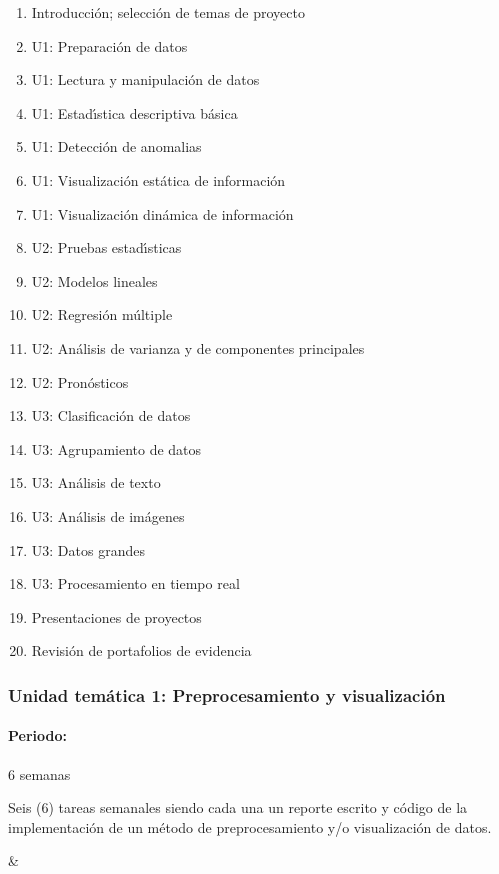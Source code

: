 \begin{enumerate}[itemsep=-3pt]
\item{Introducci\'{o}n; selecci\'{o}n de temas de proyecto}
\item{U1: Preparaci\'{o}n de datos}
\item{U1: Lectura y manipulaci\'{o}n de datos}
\item{U1: Estad\'{\i}stica descriptiva b\'{a}sica}
\item{U1: Detecci\'{o}n de anomalias}
\item{U1: Visualizaci\'{o}n est\'{a}tica de informaci\'{o}n}
\item{U1: Visualizaci\'{o}n din\'{a}mica de informaci\'{o}n}
\item{U2: Pruebas estad\'{\i}sticas}
\item{U2: Modelos lineales}
\item{U2: Regresi\'{o}n m\'{u}ltiple}
\item{U2: An\'{a}lisis de varianza y de componentes principales}
\item{U2: Pron\'{o}sticos}
\item{U3: Clasificaci\'{o}n de datos}
\item{U3: Agrupamiento de datos}
\item{U3: An\'{a}lisis de texto}
\item{U3: An\'{a}lisis de im\'{a}genes}
\item{U3: Datos grandes}
\item{U3: Procesamiento en tiempo real}
\item{Presentaciones de proyectos}
\item{Revisi\'{o}n de portafolios de evidencia}
\end{enumerate}


\subsubsection{Unidad tem\'{a}tica 1: Preprocesamiento y visualizaci\'{o}n}

\paragraph{Periodo:} 6 semanas



Seis (6) tareas semanales siendo cada una un reporte escrito y
c\'{o}digo de la implementaci\'{o}n de un m\'{e}todo de
preprocesamiento y/o visualizaci\'{o}n de datos.

&

